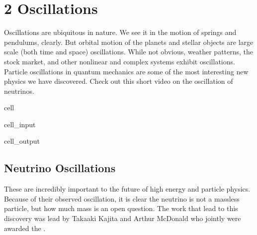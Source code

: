 \documentclass[letterpaper,10pt,english]{jupyterBook}
\begin{document}
\sphinxstepscope


\chapter{2 \sphinxhyphen{} Oscillations}
\label{\detokenize{content/2_oscillations/readings-oscillators:oscillations}}\label{\detokenize{content/2_oscillations/readings-oscillators::doc}}
\sphinxAtStartPar
Oscillations are ubiquitous in nature. We see it in the motion of springs and pendulums, clearly. But orbital motion of the planets and stellar objects are large scale (both time and space) oscillations. While not obvious, weather patterns, the stock market, and other nonlinear and complex systems exhibit oscillations. Particle oscillations in quantum mechanics are some of the most interesting new physics we have discovered. Check out this short video on the oscillation of neutrinos.

\begin{sphinxuseclass}{cell}\begin{sphinxVerbatimInput}

\begin{sphinxuseclass}{cell_input}
\begin{sphinxVerbatim}[commandchars=\\\{\}]
   
  
\end{sphinxVerbatim}

\end{sphinxuseclass}\end{sphinxVerbatimInput}
\begin{sphinxVerbatimOutput}

\begin{sphinxuseclass}{cell_output}
\noindent{}

\end{sphinxuseclass}\end{sphinxVerbatimOutput}

\end{sphinxuseclass}

\section{Neutrino Oscillations}
\label{\detokenize{content/2_oscillations/readings-oscillators:neutrino-oscillations}}
\sphinxAtStartPar
These  are incredibly important to the future of high energy and particle physics. Because of their observed oscillation, it is clear the neutrino is not a massless particle, but how much mass is an open question. The work that lead to this discovery was lead by Takaaki Kajita and Arthur McDonald who jointly were awarded the .
\end{document}
